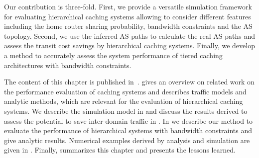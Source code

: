 Our contribution is three-fold.
First, we provide a versatile simulation framework for evaluating hierarchical caching systems allowing to consider different features including the home router sharing probability, bandwidth constraints and the AS topology.
Second, we use the inferred AS paths to calculate the real AS paths and assess the transit cost savings by hierarchical caching systems.
Finally, we develop a method to accurately assess the system performance of tiered caching architectures with bandwidth constraints.



The content of this chapter is published in~\cite{lareida2015augmenting,info3-inproceedings-2015-530,info3-inproceedings-2015-514,burger2016hierarchical}.
 gives an overview on related work on the performance evaluation of caching systems and describes traffic models and analytic methods, which are relevant for the evaluation of hierarchical caching systems.
We describe the simulation model in  and discuss the results derived to assess the potential to save inter-domain traffic in .
In  we describe our method to evaluate the performance of hierarchical systems with bandwidth constraints and give analytic results.
Numerical examples derived by analysis and simulation are given in .
Finally,  summarizes this chapter and presents the lessons learned.




%


% 

